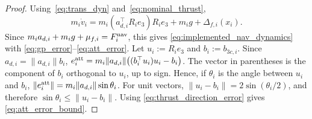 \documentclass[journal,twoside,web]{ieeecolor}
\begin{document}


\begin{proof}
Using~\eqref{eq:trans_dyn} and~\eqref{eq:nominal_thrust},
\[
m_i\dot v_i
=
m_i(a_{d,i}^{\top}R_ie_3)R_ie_3
+
m_ig
+
\Delta_{f,i}(x_i).
\]
Since \(m_i a_{d,i}+m_ig+\mu_{f,i}=F_i^{\rm nav}\), this gives
\eqref{eq:implemented_nav_dynamics} with
\eqref{eq:gp_error}--\eqref{eq:att_error}. Let \(u_i:=R_ie_3\) and \(b_i:=b_{3c,i}\). Since
\(a_{d,i}=\|a_{d,i}\|b_i\),
$e_i^{\rm att}
=
m_i\|a_{d,i}\|\big((b_i^\top u_i)u_i-b_i\big)$. The vector in parentheses is the component of \(b_i\) orthogonal to
\(u_i\), up to sign. Hence, if \(\theta_i\) is the angle between
\(u_i\) and \(b_i\),
$\|e_i^{\rm att}\|
=
m_i\|a_{d,i}\|\sin\theta_i$.
For unit vectors, \(\|u_i-b_i\|=2\sin(\theta_i/2)\), and therefore
\(\sin\theta_i\le \|u_i-b_i\|\). Using
\eqref{eq:thrust_direction_error} gives
\eqref{eq:att_error_bound}.
\end{proof}
\end{document}
